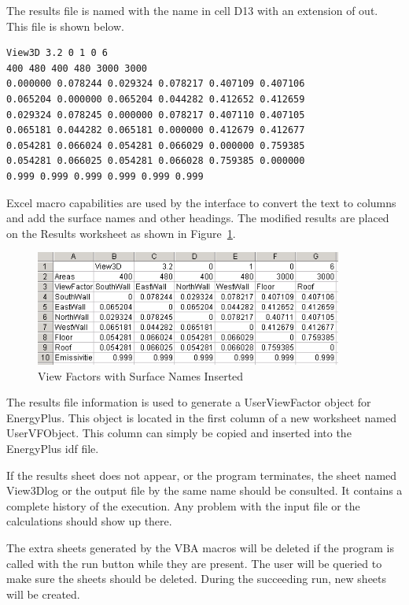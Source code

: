 The results file is named with the name in cell D13 with an extension of out. This file is shown below.

\begin{lstlisting}
View3D 3.2 0 1 0 6
400 480 400 480 3000 3000
0.000000 0.078244 0.029324 0.078217 0.407109 0.407106
0.065204 0.000000 0.065204 0.044282 0.412652 0.412659
0.029324 0.078245 0.000000 0.078217 0.407110 0.407105
0.065181 0.044282 0.065181 0.000000 0.412679 0.412677
0.054281 0.066024 0.054281 0.066029 0.000000 0.759385
0.054281 0.066025 0.054281 0.066028 0.759385 0.000000
0.999 0.999 0.999 0.999 0.999 0.999
\end{lstlisting}

Excel macro capabilities are used by the interface to convert the text to columns and add the surface names and other headings. The modified results are placed on the Results worksheet as shown in Figure~\ref{fig:view-factors-with-surface-names-inserted}.

\begin{figure}[hbtp] %
\centering
\includegraphics[width=0.9\textwidth, height=0.9\textheight, keepaspectratio=true]{media/image026.png}
\caption{View Factors with Surface Names Inserted \protect \label{fig:view-factors-with-surface-names-inserted}}
\end{figure}

The results file information is used to generate a UserViewFactor object for EnergyPlus. This object is located in the first column of a new worksheet named UserVFObject. This column can simply be copied and inserted into the EnergyPlus idf file.

If the results sheet does not appear, or the program terminates, the sheet named View3Dlog or the output file by the same name should be consulted. It contains a complete history of the execution. Any problem with the input file or the calculations should show up there.

The extra sheets generated by the VBA macros will be deleted if the program is called with the run button while they are present. The user will be queried to make sure the sheets should be deleted. During the succeeding run, new sheets will be created.

